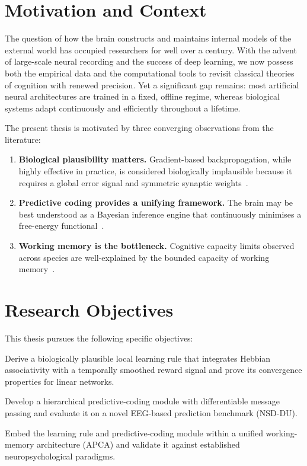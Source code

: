 \documentclass[12pt, a4paper, oneside]{report}
\theoremstyle{definition}
\theoremstyle{remark}
\begin{document}
\section{Motivation and Context}

The question of how the brain constructs and maintains internal models of the external
world has occupied researchers for well over a century.  With the advent of large-scale
neural recording and the success of deep learning, we now possess both the empirical
data and the computational tools to revisit classical theories of cognition with renewed
precision.  Yet a significant gap remains: most artificial neural architectures are
trained in a fixed, offline regime, whereas biological systems adapt continuously and
efficiently throughout a lifetime.

\medskip
The present thesis is motivated by three converging observations from the literature:
\begin{enumerate}
  \item \textbf{Biological plausibility matters.} Gradient-based backpropagation, while
        highly effective in practice, is considered biologically implausible because it
        requires a global error signal and symmetric synaptic weights~\cite{crick1989}.
  \item \textbf{Predictive coding provides a unifying framework.} The brain may be best
        understood as a Bayesian inference engine that continuously minimises a free-energy
        functional~\cite{friston2010}.
  \item \textbf{Working memory is the bottleneck.} Cognitive capacity limits observed
        across species are well-explained by the bounded capacity of working
        memory~\cite{cowan2001}.
\end{enumerate}

\section{Research Objectives}

This thesis pursues the following specific objectives:
\begin{description}[leftmargin=2.5em, style=nextline]
  \item[Objective 1] Derive a biologically plausible local learning rule that integrates
        Hebbian associativity with a temporally smoothed reward signal and prove its
        convergence properties for linear networks.
  \item[Objective 2] Develop a hierarchical predictive-coding module with differentiable
        message passing and evaluate it on a novel EEG-based prediction benchmark
        (NSD-DU).
  \item[Objective 3] Embed the learning rule and predictive-coding module within a unified
        working-memory architecture (APCA) and validate it against established
        neuropsychological paradigms.
\end{description}
\end{document}
